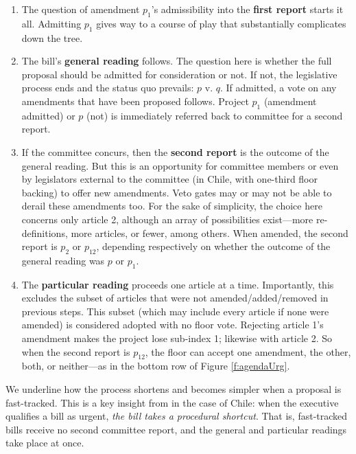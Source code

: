 \documentclass[letter,12pt]{article}
\begin{document}
\begin{enumerate}
\item The question of amendment $p_1$'s admissibility into the \textbf{first report} starts it all. Admitting $p_1$ gives way to a course of play that substantially complicates down the tree. 
\item The bill's \textbf{general reading} follows. The question here is whether the full proposal should be admitted for consideration or not. If not, the legislative process ends and the status quo prevails: $p$ v. $q$. If admitted, a vote on any amendments that have been proposed follows. Project $p_1$ (amendment admitted) or $p$ (not) is immediately referred back to committee for a second report. 
\item If the committee concurs, then the \textbf{second report} is the outcome of the general reading. But this is an opportunity for committee members or even by legislators external to the committee (in Chile, with one-third floor backing) to offer new amendments. Veto gates may or may not be able to derail these amendments too. For the sake of simplicity, the choice here concerns only article 2, although an array of possibilities exist---more re-definitions, more articles, or fewer, among others. When amended, the second report is $p_2$ or $p_{12}$, depending respectively on whether the outcome of the general reading was $p$ or $p_1$. 
\item The \textbf{particular reading} proceeds one article at a time. Importantly, this excludes the subset of articles that were not amended/added/removed in previous steps. This subset (which may include every article if none were amended) is considered adopted with no floor vote. Rejecting article 1's amendment makes the project lose sub-index 1; likewise with article 2. So when the second report is $p_{12}$, the floor can accept one amendment, the other, both, or neither---as in the bottom row of Figure \ref{f:agendaUrg}. 
\end{enumerate}

We underline how the process shortens and becomes simpler when a proposal is fast-tracked. This is a key insight from \citet{sotoCongChile2015} in the case of Chile: when the executive qualifies a bill as urgent, \emph{the bill takes a procedural shortcut}. That is, fast-tracked bills receive no second committee report, and the general and particular readings take place at once.

\end{document}
